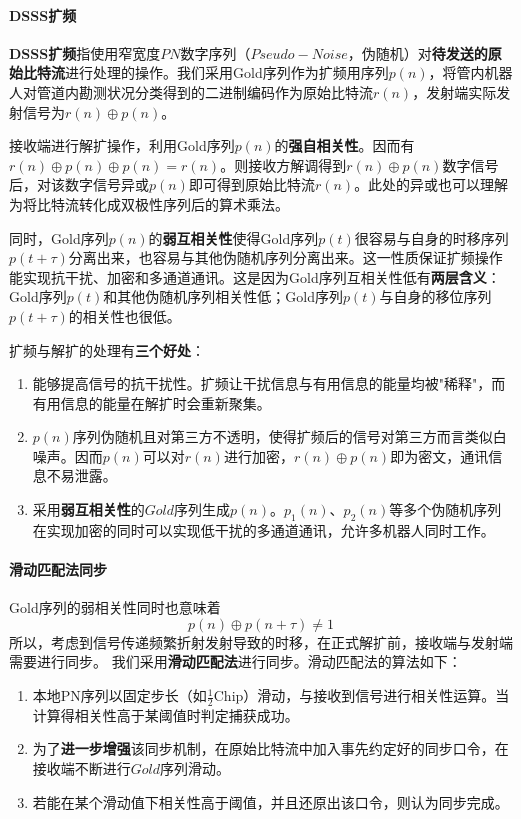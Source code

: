 \documentclass[12pt, a4paper]{article}
\begin{document}
\paragraph{DSSS扩频}

\textbf{DSSS扩频}指使用窄宽度$PN$数字序列（$Pseudo-Noise$，伪随机）对\textbf{待发送的原始比特流}进行处理的操作。我们采用Gold序列作为扩频用序列$p(n)$，将管内机器人对管道内勘测状况分类得到的二进制编码作为原始比特流$r(n)$，发射端实际发射信号为$r(n)\oplus p(n)$。

接收端进行解扩操作，利用Gold序列$p(n)$的\textbf{强自相关性}。因而有$r(n)\oplus p(n)\oplus p(n)=r(n)$。则接收方解调得到$r(n)\oplus p(n)$数字信号后，对该数字信号异或$p(n)$即可得到原始比特流$r(n)$。此处的异或也可以理解为将比特流转化成双极性序列后的算术乘法。

同时，Gold序列$p(n)$的\textbf{弱互相关性}使得Gold序列$p(t)$很容易与自身的时移序列$p(t+\tau)$分离出来，也容易与其他伪随机序列分离出来。这一性质保证扩频操作能实现抗干扰、加密和多通道通讯。这是因为Gold序列互相关性低有\textbf{两层含义}：Gold序列$p(t)$和其他伪随机序列相关性低；Gold序列$p(t)$与自身的移位序列$p(t+\tau)$的相关性也很低。

扩频与解扩的处理有\textbf{三个好处}：

\begin{enumerate}
    \item 能够提高信号的抗干扰性。扩频让干扰信息与有用信息的能量均被"稀释"，而有用信息的能量在解扩时会重新聚集。
    \item $p(n)$序列伪随机且对第三方不透明，使得扩频后的信号对第三方而言类似白噪声。因而$p(n)$可以对$r(n)$进行加密，$r(n)\oplus p(n)$即为密文，通讯信息不易泄露。
    \item 采用\textbf{弱互相关性}的$Gold$序列生成$p(n)$。$p_1(n)$、$p_2(n)$等多个伪随机序列在实现加密的同时可以实现低干扰的多通道通讯，允许多机器人同时工作。
\end{enumerate}

\paragraph{滑动匹配法同步}

Gold序列的弱相关性同时也意味着$$p(n)\oplus p(n+\tau)\neq1$$所以，考虑到信号传递频繁折射发射导致的时移，在正式解扩前，接收端与发射端需要进行同步。
我们采用\textbf{滑动匹配法}进行同步。滑动匹配法的算法如下：

\begin{enumerate}
    \item 本地PN序列以固定步长（如$\frac{1}{2} \text{Chip}$）滑动，与接收到信号进行相关性运算。当计算得相关性高于某阈值时判定捕获成功。
    \item 为了\textbf{进一步增强}该同步机制，在原始比特流中加入事先约定好的同步口令，在接收端不断进行$Gold$序列滑动。
    \item 若能在某个滑动值下相关性高于阈值，并且还原出该口令，则认为同步完成。
\end{enumerate}
\end{document}
